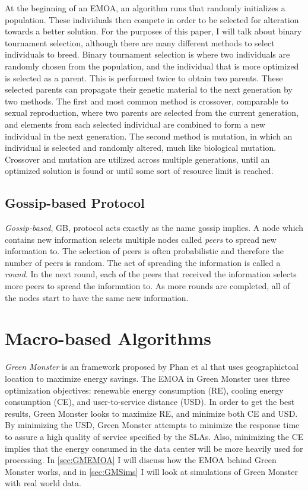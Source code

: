 \documentclass{sig-alternate}
\begin{document}
At the beginning of an EMOA, an algorithm runs that randomly initializes a population. These individuals then compete in order to be selected for alteration towards a better solution. For the purposes of this paper, I will talk about binary tournament selection, although there are many different methods to select individuals to breed. Binary tournament selection is where two individuals are randomly chosen from the population, and the individual that is more optimized is selected as a parent. This is performed twice to obtain two parents.  These selected parents can propagate their genetic material to the next generation by two methods. The first and most common method is crossover, comparable to sexual reproduction, where two parents are selected from the current generation, and elements from each selected individual are combined to form a new individual in the next generation. The second method is mutation, in which an individual is selected and randomly altered, much like biological mutation. Crossover and mutation are utilized across multiple generations, until an optimized solution is found or until some sort of resource limit is reached.

\subsection{Gossip-based Protocol}
\label{sec:GBP}

\emph{Gossip-based}, GB, protocol acts exactly as the name gossip implies. A node which contains new information selects multiple nodes called \emph{peers} to spread new information to. The selection of peers is often probabilistic and therefore the number of peers is random. The act of spreading the information is called a \emph{round}. In the next round, each of the peers that received the information selects more peers to spread the information to. As more rounds are completed, all of the nodes start to have the same new information.~\cite{Yanggratoke}

\section{Macro-based Algorithms}
\label{sec:MacAl}

\emph{Green Monster}
is an framework proposed by Phan et al that uses geographictoal location to maximize energy savings. The EMOA in Green Monster uses three optimization objectives: renewable energy consumption (RE), cooling energy consumption (CE), and user-to-service distance (USD). In order to get the best results, Green Monster looks to maximize RE, and minimize both CE and USD. By minimizing the USD, Green Monster attempts to minimize the response time to assure a high quality of service specified by the SLAs. Also, minimizing the CE implies that the energy consumed in the data center will be more heavily used for processing. In \ref{sec:GMEMOA} I will discuss how the EMOA behind Green Monster works, and in \ref{sec:GMSims} I will look at simulations of Green Monster with real world data.~\cite{Phan}
\end{document}
